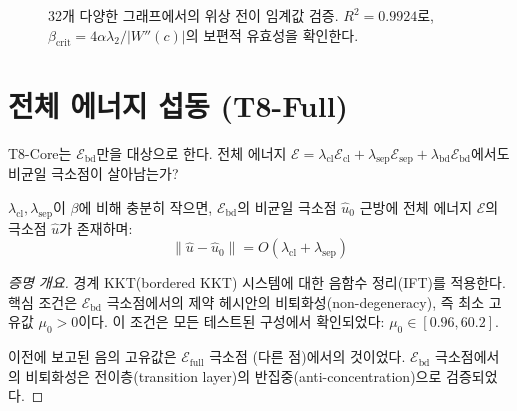 \begin{figure}[t]
\centering
\caption{32개 다양한 그래프에서의 위상 전이 임계값 검증. $R^2 = 0.9924$로, $\beta_{\mathrm{crit}} = 4\alpha\lambda_2/|W''(c)|$의 보편적 유효성을 확인한다.}
\label{fig:spectral-universality}
\end{figure}


\section{전체 에너지 섭동 (T8-Full)}
\label{sec:T8-Full}

T8-Core는 $\mathcal{E}_{\mathrm{bd}}$만을 대상으로 한다. 전체 에너지 $\mathcal{E} = \lambda_{\mathrm{cl}} \mathcal{E}_{\mathrm{cl}} + \lambda_{\mathrm{sep}} \mathcal{E}_{\mathrm{sep}} + \lambda_{\mathrm{bd}} \mathcal{E}_{\mathrm{bd}}$에서도 비균일 극소점이 살아남는가?

\begin{theorem}
\label{thm:T8-Full}
$\lambda_{\mathrm{cl}}, \lambda_{\mathrm{sep}}$이 $\beta$에 비해 충분히 작으면, $\mathcal{E}_{\mathrm{bd}}$의 비균일 극소점 $\hat{u}_0$ 근방에 전체 에너지 $\mathcal{E}$의 극소점 $\hat{u}$가 존재하며:
\begin{equation}
    \|\hat{u} - \hat{u}_0\| = O(\lambda_{\mathrm{cl}} + \lambda_{\mathrm{sep}})
\end{equation}
\end{theorem}

\begin{proof}[증명 개요]
경계 KKT(bordered KKT) 시스템에 대한 음함수 정리(IFT)를 적용한다. 핵심 조건은 $\mathcal{E}_{\mathrm{bd}}$ 극소점에서의 제약 헤시안의 비퇴화성(non-degeneracy), 즉 최소 고유값 $\mu_0 > 0$이다. 이 조건은 모든 테스트된 구성에서 확인되었다: $\mu_0 \in [0.96, 60.2]$.

이전에 보고된 음의 고유값은 $\mathcal{E}_{\mathrm{full}}$ 극소점 (다른 점)에서의 것이었다. $\mathcal{E}_{\mathrm{bd}}$ 극소점에서의 비퇴화성은 전이층(transition layer)의 반집중(anti-concentration)으로 검증되었다.
\end{proof}

